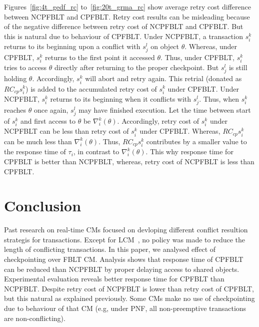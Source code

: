 \documentclass[conference]{IEEEtran}
\begin{document}
Figures~\ref{fig:4t_gedf_rc} to~\ref{fig:20t_grma_rc} show average retry cost difference between NCPFBLT and CPFBLT. Retry cost results can be misleading because of the negative difference between retry cost of NCPFBLT and CPFBLT. But this is natural due to behaviour of CPFBLT. Under NCPFBLT, a transaction $s_i^k$ returns to its beginning upon a conflict with $s_j^l$ on object $\theta$. Whereas, under CPFBLT, $s_i^k$ returns to the first point it accessed $\theta$. Thus, under CPFBLT, $s_i^k$ tries to access $\theta$ directly after returning to the proper checkpoint. But $s_j^l$ is still holding $\theta$. Accordingly, $s_i^k$ will abort and retry again. This retrial (donated as $RC_{cp}s_i^k$) is added to the accumulated retry cost of $s_i^k$ under CPFBLT. Under NCPFBLT, $s_i^k$ returns to its beginning when it conflicts with $s_j^l$. Thus, when $s_i^k$ reaches $\theta$ once again, $s_j^l$ may have finished execution. Let the time between start of $s_i^k$ and first access to $\theta$ be $\nabla_i^k(\theta)$. Accordingly, retry cost of $s_i^k$ under NCPFBLT can be less than retry cost of $s_i^k$ under CPFBLT. Whereas, $RC_{cp}s_i^k$ can be much less than $\nabla_i^k(\theta)$. Thus, $RC_{cp}s_i^k$ contributes by a smaller value to the response time of $\tau_i$, in contrast to $\nabla_i^k(\theta)$. This why response time for CPFBLT is better than NCPFBLT, whereas, retry cost of NCPFBLT is less than CPFBLT.
\section{Conclusion}\label{sec:conclusion}

Past research on real-time CMs focused on devloping different conflict resultion strategis for transactions. Except for LCM~\cite{lcmdac2012}, no policy was made to reduce the length of conflicting transactions. In this paper, we analysed effect of checkpointing over FBLT CM. Analysis shows that response time of CPFBLT can be reduced than NCPFBLT by proper delaying access to shared objects. Experimental evaluation reveals better response time for CPFBLT than NCPFBLT. Despite retry cost of NCPFBLT is lower than retry cost of CPFBLT, but this natural as explained previously. Some CMs make no use of checkpointing due to behaviour of that CM (e.g, under PNF, all non-preemptive transactions are non-conflicting).



%




\end{document}
